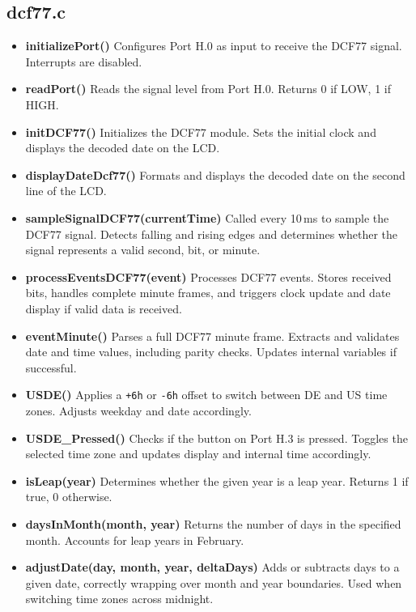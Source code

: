\documentclass[a4paper,12pt]{article}
\begin{document}
\subsection{dcf77.c}
\begin{itemize}
    \item \textbf{initializePort()}  
    Configures Port H.0 as input to receive the DCF77 signal. Interrupts are disabled.

    \item \textbf{readPort()}  
    Reads the signal level from Port H.0. Returns 0 if LOW, 1 if HIGH.

    \item \textbf{initDCF77()}  
    Initializes the DCF77 module. Sets the initial clock and displays the decoded date on the LCD.

    \item \textbf{displayDateDcf77()}  
    Formats and displays the decoded date on the second line of the LCD.

    \item \textbf{sampleSignalDCF77(currentTime)}  
    Called every 10\,ms to sample the DCF77 signal. Detects falling and rising edges and determines whether the signal represents a valid second, bit, or minute.

    \item \textbf{processEventsDCF77(event)}  
    Processes DCF77 events. Stores received bits, handles complete minute frames, and triggers clock update and date display if valid data is received.

    \item \textbf{eventMinute()}  
    Parses a full DCF77 minute frame. Extracts and validates date and time values, including parity checks. Updates internal variables if successful.

    \item \textbf{USDE()}  
    Applies a \texttt{+6h} or \texttt{-6h} offset to switch between DE and US time zones. Adjusts weekday and date accordingly.

    \item \textbf{USDE\_Pressed()}  
    Checks if the button on Port H.3 is pressed. Toggles the selected time zone and updates display and internal time accordingly.

    \item \textbf{isLeap(year)}  
    Determines whether the given year is a leap year. Returns 1 if true, 0 otherwise.

    \item \textbf{daysInMonth(month, year)}  
    Returns the number of days in the specified month. Accounts for leap years in February.

    \item \textbf{adjustDate(day, month, year, deltaDays)}  
    Adds or subtracts days to a given date, correctly wrapping over month and year boundaries. Used when switching time zones across midnight.
\end{itemize}
\end{document}
